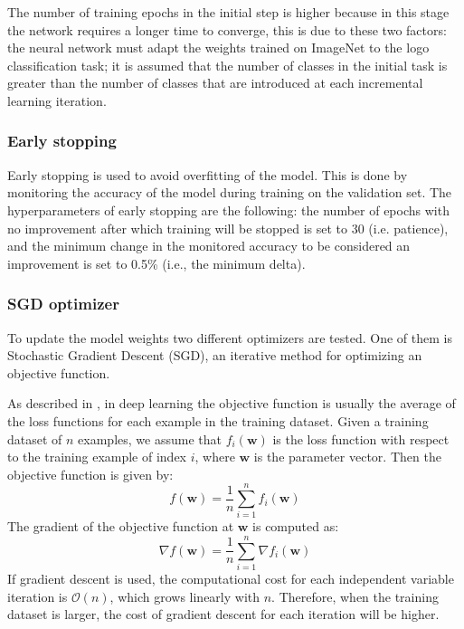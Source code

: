 The number of training epochs in the initial step is higher because in this stage the network requires a longer time to converge, this is due to these two factors: the neural network must adapt the weights trained on ImageNet to the logo classification task;
it is assumed that the number of classes in the initial task is greater than the number of classes that are introduced at each incremental learning iteration.

\subsubsection{Early stopping}
Early stopping is used to avoid overfitting of the model. This is done by monitoring the accuracy of the model during training on the validation set. The hyperparameters of early stopping are the following: the number of epochs with no improvement after which training will be stopped is set to 30 (i.e. patience), and the minimum change in the monitored accuracy to be considered an improvement is set to 0.5\% (i.e., the minimum delta).

\subsubsection{SGD optimizer}
To update the model weights two different optimizers are tested.
One of them is Stochastic Gradient Descent (SGD), an iterative method for optimizing an objective function.

As described in \cite{zhang2021dive}, in deep learning the objective function is usually the average of the loss functions for each example in the training dataset. Given a training dataset of $n$ examples, we assume that $f_i(\textbf{w})$ is the loss function with respect to the training example of index $i$, where $\textbf{w}$ is the parameter vector. Then the objective function is given by:
\begin{equation}
    f(\textbf{w}) = \frac{1}{n} \sum_{i=1}^n f_i(\textbf{w})
\end{equation}
The gradient of the objective function at $\textbf{w}$ is computed as:
\begin{equation}
    \nabla f(\textbf{w}) = \frac{1}{n} \sum_{i=1}^n \nabla f_i(\textbf{w})
\end{equation}
If gradient descent is used, the computational cost for each independent variable iteration is $\mathcal{O}(n)$, which grows linearly with $n$. Therefore, when the training dataset is larger, the cost of gradient descent for each iteration will be higher.

